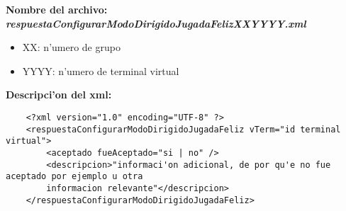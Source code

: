 \bf{Nombre del archivo:} \it{respuestaConfigurarModoDirigidoJugadaFelizXXYYYY.xml}
\begin{itemize}
    \item{XX: n'umero de grupo}
    \item{YYYY: n'umero de terminal virtual}
\end{itemize}

\bf{Descripci'on del xml:}
\begin{verbatim}
    <?xml version="1.0" encoding="UTF-8" ?>
    <respuestaConfigurarModoDirigidoJugadaFeliz vTerm="id terminal virtual">
        <aceptado fueAceptado="si | no" />
        <descripcion>"informaci'on adicional, de por qu'e no fue aceptado por ejemplo u otra
        informacion relevante"</descripcion>
    </respuestaConfigurarModoDirigidoJugadaFeliz>
\end{verbatim}
